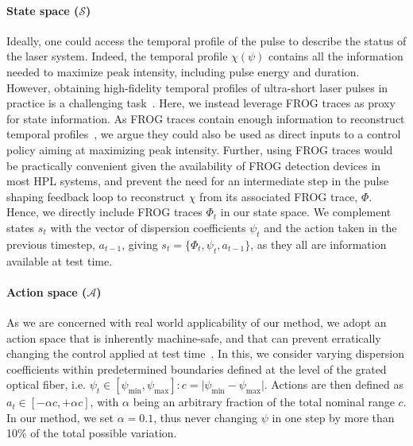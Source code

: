 \paragraph{State space (\( \mathcal S \))}
Ideally, one could access the temporal profile of the pulse to describe the status of the laser system. Indeed, the temporal profile \( \chi(\psi) \) contains all the information needed to maximize peak intensity, including pulse energy and duration.
However, obtaining high-fidelity temporal profiles of ultra-short laser pulses in practice is a challenging task~\citep{trebino1993using, trebino1997measuring}.
Here, we instead leverage FROG traces as proxy for state information.
As FROG traces contain enough information to reconstruct temporal profiles~\citep{zahavy2018deep}, we argue they could also be used as direct inputs to a control policy aiming at maximizing peak intensity. Further, using FROG traces would be practically convenient given the availability of FROG detection devices in most HPL systems, and prevent the need for an intermediate step in the pulse shaping feedback loop to reconstruct \( \chi \) from its associated FROG trace, \( \Phi \). Hence, we directly include FROG traces \( \Phi_t \) in our state space. We complement states \( s_t \) with the vector of dispersion coefficients \( \psi_t \) and the action taken in the previous timestep, \( a_{t-1} \), giving \( s_t = \{ \Phi_t, \psi_t, a_{t-1} \} \), as they all are information available at test time.

\paragraph{Action space (\( \mathcal A \))}
As we are concerned with real world applicability of our method, we adopt an action space that is inherently machine-safe, and that can prevent erratically changing the control applied at test time~\citep{capuano2023temporl}. In this, we consider varying dispersion coefficients within predetermined boundaries defined at the level of the grated optical fiber, i.e. \( \psi_t \in [\psi_{\text{min}}, \psi_\text{max}]: c = \vert\psi_{\text{min}} - \psi_\text{max} \vert \). Actions are then defined as \( a_t \in [-\alpha c, +\alpha c] \), with \( \alpha \) being an arbitrary fraction of the total nominal range \( c \). In our method, we set \( \alpha=0.1 \), thus never changing \( \psi \) in one step by more than 10\% of the total possible variation.

